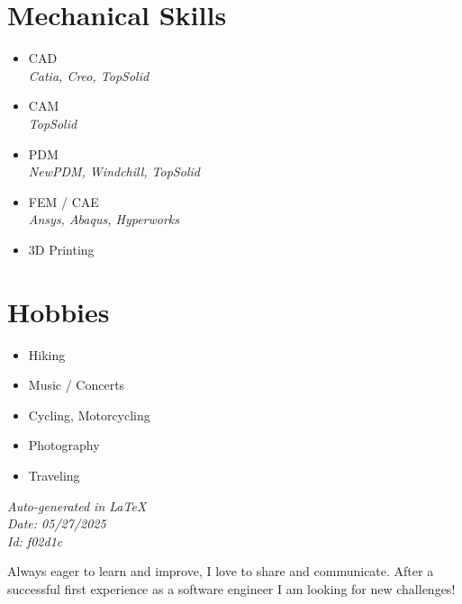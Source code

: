 \documentclass[]{friggeri-cv}
\begin{document}
\begin{aside}
\section{Mechanical Skills}
\begin{itemize}
\item CAD
 \\ \hspace*{0.2em}\small\textit{Catia, Creo, TopSolid}
\item CAM
 \\ \hspace*{0.2em}\small\textit{TopSolid}
\item PDM
 \\ \hspace*{0.2em}\small\textit{NewPDM, Windchill, TopSolid}
\item FEM / CAE
 \\ \hspace*{0.2em}\small\textit{Ansys, Abaqus, Hyperworks}
\item 3D Printing
\end{itemize}
\section{Hobbies}
\begin{itemize}
\item Hiking
\item Music / Concerts
\item Cycling, Motorcycling
\item Photography
\item Traveling
\end{itemize}
\vspace{2.5mm}%
\small \emph{Auto-generated in \LaTeX}\\
\small \emph{Date: 05/27/2025} \hspace*{8mm}\\
\small \emph{Id: f02d1c} %

\end{aside}

\vspace*{-2.0mm}
\noindent\parbox{\linewidth}{
  \centering
  Always eager to learn and improve, I love to share and communicate. After a successful first experience as a software engineer I am looking for new challenges!
}
\vspace*{0.8mm}
\end{document}
